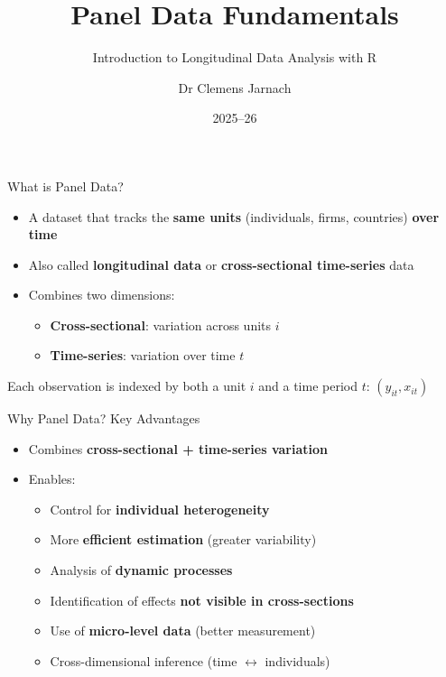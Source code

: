 \documentclass[aspectratio=169]{beamer}
\title{Panel Data Fundamentals}
\subtitle{Introduction to Longitudinal Data Analysis with R}
\author{Dr Clemens Jarnach}
\institute{University of Oxford}
\date{2025--26}
\newenvironment{callout-note}[1][Note]{%
  \begin{tcolorbox}[colback=noteblue, colframe=noteframe,
    title={\textbf{#1}}, fonttitle=\small\bfseries,
    left=4pt, right=4pt, top=2pt, bottom=2pt]
}{\end{tcolorbox}}
\begin{document}
\begin{frame}
  \titlepage
\end{frame}

\begin{frame}{What is Panel Data?}
  \begin{itemize}
    \item A dataset that tracks the \textbf{same units} (individuals, firms, countries) \textbf{over time}
    \item Also called \textbf{longitudinal data} or \textbf{cross-sectional time-series} data
    \item Combines two dimensions:
      \begin{itemize}
        \item \textbf{Cross-sectional}: variation across units $i$
        \item \textbf{Time-series}: variation over time $t$
      \end{itemize}
  \end{itemize}

  \vspace{0.5em}
  \begin{callout-note}
    Each observation is indexed by both a unit $i$ and a time period $t$: $(y_{it}, x_{it})$
  \end{callout-note}
\end{frame}

\begin{frame}{Why Panel Data? Key Advantages}
  \begin{itemize}
    \item Combines \textbf{cross-sectional + time-series variation}
    \item Enables:
      \begin{itemize}
        \item<2-> Control for \textbf{individual heterogeneity}
        \item<3-> More \textbf{efficient estimation} (greater variability)
        \item<4-> Analysis of \textbf{dynamic processes}
        \item<5-> Identification of effects \textbf{not visible in cross-sections}
        \item<6-> Use of \textbf{micro-level data} (better measurement)
        \item<7-> Cross-dimensional inference (time $\leftrightarrow$ individuals)
      \end{itemize}
  \end{itemize}
\end{frame}
\end{document}
